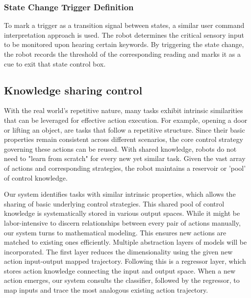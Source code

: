 \documentclass[conference]{IEEEtran}
\begin{document}
\subsubsection{State Change Trigger Definition}
To mark a trigger as a transition signal between states, a similar user command interpretation approach is used. The robot determines the critical sensory input to be monitored upon hearing certain keywords. By triggering the state change, the robot records the threshold of the corresponding reading and marks it as a cue to exit that state control box.

\subsection{Knowledge sharing control}
\label{sec:knowledgesharing}

With the real world's repetitive nature, many tasks exhibit intrinsic similarities that can be leveraged for effective action execution. For example, opening a door or lifting an object, are tasks that follow a repetitive structure. Since their basic properties remain consistent across different scenarios, the core control strategy governing these actions can be reused. With shared knowledge, robots do not need to "learn from scratch" for every new yet similar task. Given the vast array of actions and corresponding strategies, the robot maintains a reservoir or 'pool' of control knowledge. 

Our system identifies tasks with similar intrinsic properties, which allows the sharing of basic underlying control strategies. This shared pool of control knowledge is systematically stored in various output spaces. While it might be labor-intensive to discern relationships between every pair of actions manually, our system turns to mathematical modeling. This ensures new actions are matched to existing ones efficiently. Multiple abstraction layers of models will be incorporated. The first layer reduces the dimensionality using the given new action input-output mapped trajectory. Following this is a regressor layer, which stores action knowledge connecting the input and output space. When a new action emerges, our system consults the classifier, followed by the regressor, to map inputs and trace the most analogous existing action trajectory.
\end{document}
